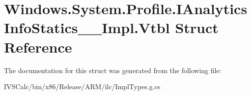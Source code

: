 \hypertarget{struct_windows_1_1_system_1_1_profile_1_1_i_analytics_info_statics_____impl_1_1_vtbl}{}\section{Windows.\+System.\+Profile.\+I\+Analytics\+Info\+Statics\+\_\+\+\_\+\+Impl.\+Vtbl Struct Reference}
\label{struct_windows_1_1_system_1_1_profile_1_1_i_analytics_info_statics_____impl_1_1_vtbl}


The documentation for this struct was generated from the following file\+:\begin{DoxyCompactItemize}
\item 
I\+V\+S\+Calc/bin/x86/\+Release/\+A\+R\+M/ilc/Impl\+Types.\+g.\+cs\end{DoxyCompactItemize}
